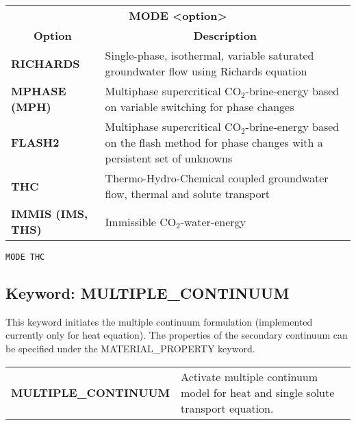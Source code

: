 
\begin{tabularx}{\linewidth}{lX}
\multicolumn{2}{c}{\bf MODE <option>}\\
\multicolumn{1}{c}{\bf Option} & \multicolumn{1}{c}{\bf Description}\\
\bf RICHARDS &Single-phase, isothermal, variable saturated groundwater flow using Richards equation\\
\bf MPHASE (MPH) &Multiphase supercritical CO$_2$-brine-energy based on variable switching for phase changes\\
\bf FLASH2 &Multiphase supercritical CO$_2$-brine-energy based on the flash method for phase changes with a persistent set of unknowns\\
\bf THC &Thermo-Hydro-Chemical coupled groundwater flow, thermal and solute transport\\
\bf IMMIS (IMS, THS) &Immissible CO$_2$-water-energy\\
\end{tabularx}

\begin{mdframed}

\begin{verbatim}
MODE THC
\end{verbatim}
\end{mdframed}

\hyperlink{target_key}{\return}


\newpage
\protect\hypertarget{target_mc}{}

\subsection{Keyword: MULTIPLE\_CONTINUUM}

This keyword initiates the multiple continuum formulation (implemented currently only for heat equation). The properties of the secondary continuum can be
specified under the MATERIAL\_PROPERTY keyword.

\begin{tabularx}{\linewidth}{lX}
\bf MULTIPLE\_CONTINUUM & Activate multiple continuum model for heat and single solute transport equation. 
\end{tabularx}

